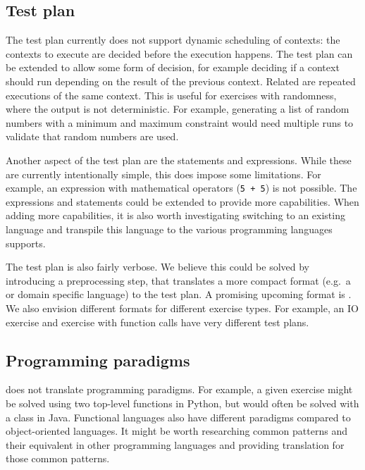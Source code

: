 \documentclass[5p,number]{elsarticle}
\begin{document}
    \subsection{Test plan}\label{subsec:test-plan}

    The test plan currently does not support dynamic scheduling of contexts: the contexts to execute are decided before the execution happens.
    The test plan can be extended to allow some form of decision, for example deciding if a context should run depending on the result of the previous context.
    Related are repeated executions of the same context.
    This is useful for exercises with randomness, where the output is not deterministic.
    For example, generating a list of random numbers with a minimum and maximum constraint would need multiple runs to validate that random numbers are used.
    
    Another aspect of the test plan are the statements and expressions.
    While these are currently intentionally simple, this does impose some limitations.
    For example, an expression with mathematical operators (\texttt{5 + 5}) is not possible.
    The expressions and statements could be extended to provide more capabilities.
    When adding more capabilities, it is also worth investigating switching to an existing language and transpile this language to the various programming languages \tested{} supports.
    
    The test plan is also fairly verbose.
    We believe this could be solved by introducing a preprocessing step, that translates a more compact format (e.g.\ a  or domain specific language) to the test plan.
    A promising upcoming format is  \cite{peml}.
    We also envision different formats for different exercise types.
    For example, an IO exercise and exercise with function calls have very different test plans.
    
    \subsection{Programming paradigms}\label{subsec:programming-paradigms}

    \tested{} does not translate programming paradigms.
    For example, a given exercise might be solved using two top-level functions in Python, but would often be solved with a class in Java.
    Functional languages also have different paradigms compared to object-oriented languages.
    It might be worth researching common patterns and their equivalent in other programming languages and providing translation for those common patterns.
    
\end{document}
